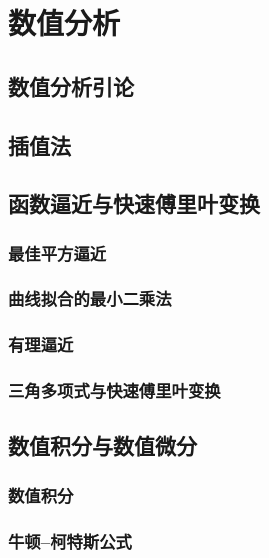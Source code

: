 \part{数值分析}
\chapter{数值分析引论}





\chapter{插值法}







\chapter{函数逼近与快速傅里叶变换}


\section{最佳平方逼近}
\section{曲线拟合的最小二乘法}
\section{有理逼近}
\section{三角多项式与快速傅里叶变换}

\chapter{数值积分与数值微分}
\section{数值积分}
\section{牛顿--柯特斯公式}

